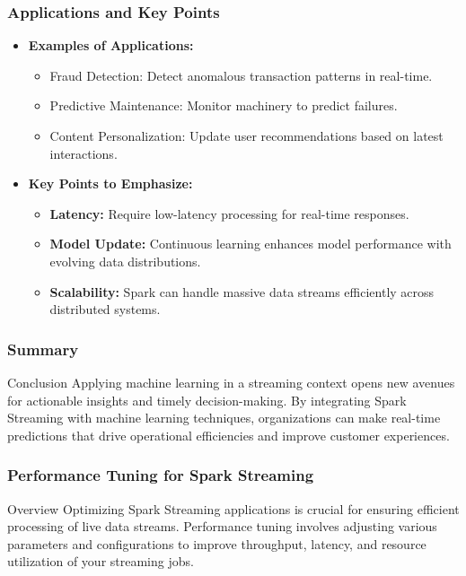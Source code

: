 \documentclass[aspectratio=169]{beamer}
\begin{document}
\begin{frame}[fragile]
    \frametitle{Applications and Key Points}
    \begin{itemize}
        \item \textbf{Examples of Applications:}
        \begin{itemize}
            \item Fraud Detection: Detect anomalous transaction patterns in real-time.
            \item Predictive Maintenance: Monitor machinery to predict failures.
            \item Content Personalization: Update user recommendations based on latest interactions.
        \end{itemize}
        
        \item \textbf{Key Points to Emphasize:}
        \begin{itemize}
            \item \textbf{Latency:} Require low-latency processing for real-time responses.
            \item \textbf{Model Update:} Continuous learning enhances model performance with evolving data distributions.
            \item \textbf{Scalability:} Spark can handle massive data streams efficiently across distributed systems.
        \end{itemize}
    \end{itemize}
\end{frame}

\begin{frame}[fragile]
    \frametitle{Summary}
    \begin{block}{Conclusion}
        Applying machine learning in a streaming context opens new avenues for actionable insights and timely decision-making. 
        By integrating Spark Streaming with machine learning techniques, organizations can make real-time predictions that drive operational efficiencies and improve customer experiences.
    \end{block}
\end{frame}

\begin{frame}
    \frametitle{Performance Tuning for Spark Streaming}
    \begin{block}{Overview}
        Optimizing Spark Streaming applications is crucial for ensuring efficient processing of live data streams. Performance tuning involves adjusting various parameters and configurations to improve throughput, latency, and resource utilization of your streaming jobs.
    \end{block}
\end{frame}
\end{document}
